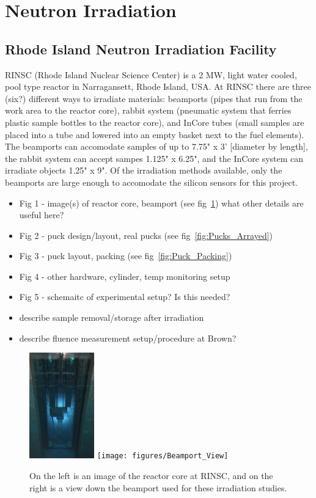 \section{Neutron Irradiation}
\label{sec:irradiation}

\subsection{Rhode Island Neutron Irradiation Facility}
\label{subsec:RINSC}
RINSC (Rhode Island Nuclear Science Center) is a 2 MW, light water cooled, pool type reactor in Narragansett, Rhode Island, USA.
At RINSC there are three (six?) different ways to irradiate materials: beamports (pipes that run from the work area to the reactor core), rabbit system (pneumatic system that ferries plastic sample bottles to the reactor core), and InCore tubes (small samples are placed into a tube and lowered into an empty basket next to the fuel elements). 
The beamports can accomodate samples of up to 7.75" x 3' [diameter by length], the rabbit system can accept sampes 1.125" x 6.25", and the InCore system can irradiate objects 1.25" x 9". 
Of the irradiation methods available, only the beamports are large enough to accomodate the silicon sensors for this project.
\begin{itemize}
    \item Fig 1 - image(s) of reactor core, beamport (see fig~\ref{fig:RINSC_Facility})
    what other details are useful here?
    \item Fig 2 - puck design/layout, real pucks (see fig~\ref{fig:Pucks_Arrayed})
    \item Fig 3 - puck layout, packing (see fig~\ref{fig:Puck_Packing})
    \item Fig 4 - other hardware, cylinder, temp monitoring setup
    \item Fig 5 - schemaitc of experimental setup? Is this needed?
    \item describe sample removal/storage after irradiation
    \item describe fluence measurement setup/procedure at Brown? 
\end{itemize}

  \begin{figure}[!hbt]
  \begin{center}
    \includegraphics[width=0.25\textwidth]{figures/RINSC_Reactor_Core}
    \texttt{[image: figures/Beamport\_View]}
    \caption{On the left is an image of the reactor core at RINSC, and on the right is a view down the beamport used for these irradiation studies.}
    \label{fig:RINSC_Facility}
  \end{center}
\end{figure}

